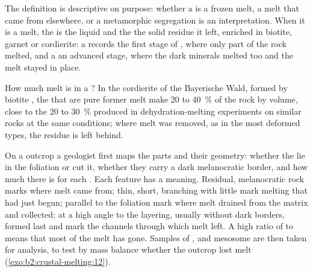 The definition is descriptive on purpose: whether a  is a frozen melt, a melt
that came from elsewhere, or a metamorphic segregation is an interpretation. When it is a
melt, the  is the liquid and the  the solid residue it left, enriched in
biotite, garnet or cordierite: a  records the first stage of , where
only part of the rock melted, and a  an advanced stage, where the dark minerals
melted too and the melt stayed in place.

How much melt is in a ? In the cordierite  of the Bayerische Wald,
formed by biotite , the  that are pure former melt make 20 to
\qty{40}{\percent} of the rock by volume, close to the 20 to \qty{30}{\percent} produced in
dehydration-melting experiments on similar rocks at the same conditions; where melt was
removed, as in the most deformed types, the residue is left behind.

\begin{inthefield}
On a  outcrop a geologist first maps the parts and their geometry: whether the
 lie in the foliation or cut it, whether they carry a dark melanocratic border,
and how much  there is for each . Each feature has a meaning. Residual,
melanocratic rock marks where melt came from; thin, short, branching  with
little  mark melting that had just begun;  parallel to the foliation
mark where melt drained from the matrix and collected;  at a high angle to the
layering, usually without dark borders, formed last and mark the channels through which
melt left. A high ratio of  to  means that most of the melt has gone.
Samples of ,  and mesosome are then taken for analysis, to test by mass
balance whether the outcrop lost melt (\cref{exo:b2:crustal-melting:12}).
\end{inthefield}

